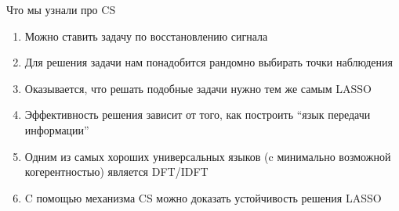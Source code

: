 \documentclass[14pt, fleqn, xcolor={dvipsnames, table}]{beamer}
\begin{document}
\begin{frame}{Что мы узнали про CS}
\small
\begin{enumerate}
  \item Можно ставить задачу по восстановлению сигнала
  \item Для решения задачи нам понадобится рандомно выбирать точки наблюдения
  \item Оказывается, что решать подобные задачи нужно тем же самым LASSO
  \item Эффективность решения зависит от того, как построить ``язык передачи информации''
  \item Одним из самых хороших универсальных языков (c минимально возможной когерентностью) является DFT/IDFT
  \item C помощью механизма CS можно доказать устойчивость решения LASSO
\end{enumerate}
\end{frame}


\end{document}
